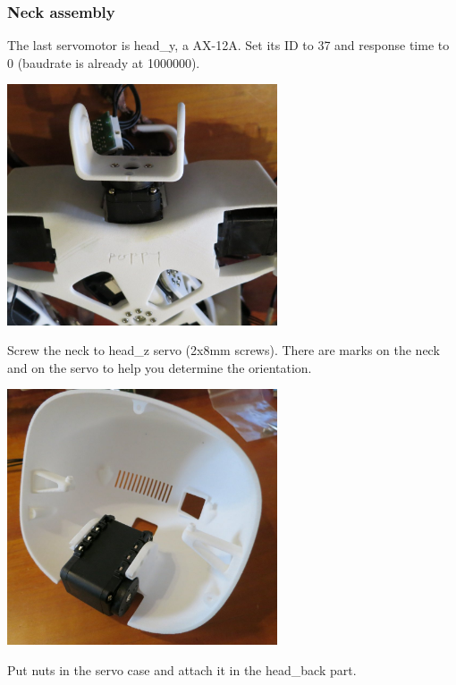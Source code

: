 \documentclass[includefoot]{article}
\begin{document}
\subsubsection{Neck assembly}

The last servomotor is head\_y, a AX-12A. Set its ID to 37 and response time to 0 (baudrate is already at 1000000).


 \begin{center}
  \includegraphics[width=0.6\textwidth]{img/neck1}
 \end{center}
 
 Screw the neck to head\_z servo (\diameter 2x8mm screws). There are marks on the neck and on the servo to help you determine the orientation.
 
 
 \begin{center}
  \includegraphics[width=0.6\textwidth]{img/neck2}
 \end{center}
 
 Put  nuts in the servo case and attach it in the head\_back part.
 
\end{document}
